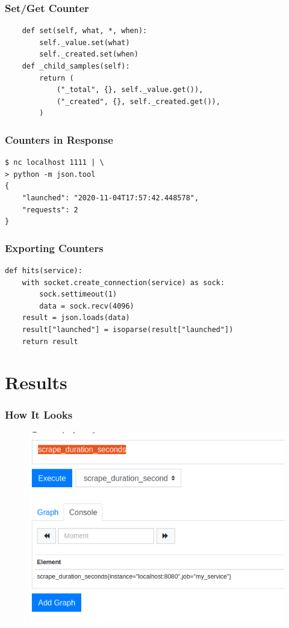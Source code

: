 \begin{frame}[fragile]
\frametitle{Set/Get Counter}
\begin{lstlisting}
    def set(self, what, *, when):
        self._value.set(what)
        self._created.set(when)
    def _child_samples(self):
        return (
            ("_total", {}, self._value.get()),
            ("_created", {}, self._created.get()),
        )
\end{lstlisting}
\end{frame}

\begin{frame}[fragile]
\frametitle{Counters in Response}

\begin{lstlisting}
$ nc localhost 1111 | \
> python -m json.tool
{
    "launched": "2020-11-04T17:57:42.448578",
    "requests": 2
}
\end{lstlisting}
\end{frame}

\begin{frame}[fragile]
\frametitle{Exporting Counters}

\begin{lstlisting}
def hits(service):
    with socket.create_connection(service) as sock:
        sock.settimeout(1)
        data = sock.recv(4096)
    result = json.loads(data)
    result["launched"] = isoparse(result["launched"])
    return result
\end{lstlisting}

\end{frame}

\section{Results}

\begin{frame}[fragile]
\frametitle{How It Looks}

\begin{figure}
\includegraphics[scale=0.25]{prometheus}
\end{figure}

\end{frame}

